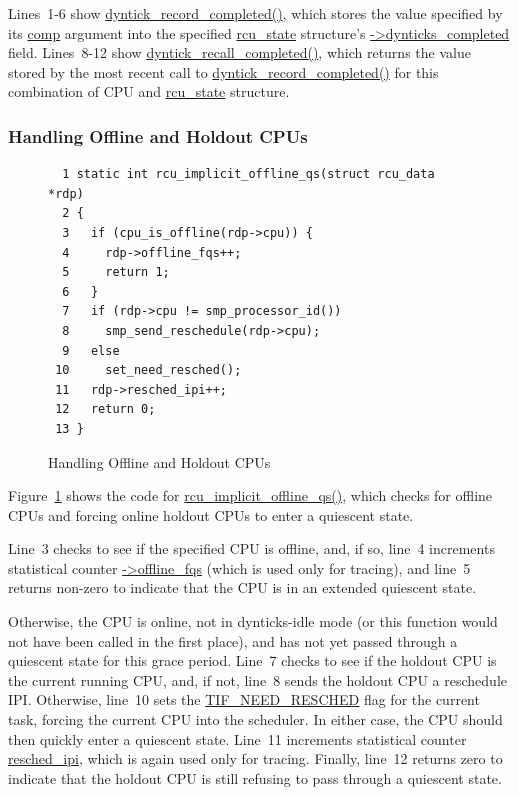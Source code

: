 Lines~1-6 show \url{dyntick_record_completed()}, which stores the
value specified by its \url{comp} argument into the specified
\url{rcu_state} structure's \url{->dynticks_completed} field.
Lines~8-12 show \url{dyntick_recall_completed()}, which returns
the value stored by the most recent call to
\url{dyntick_record_completed()} for this combination of CPU and
\url{rcu_state} structure.

\subsubsection{Handling Offline and Holdout CPUs}
\label{app:rcuimpl:rcutreewt:Handling Offline and Holdout CPUs}

\begin{figure}[tbp]
{ \scriptsize
\begin{verbatim}
  1 static int rcu_implicit_offline_qs(struct rcu_data *rdp)
  2 {
  3   if (cpu_is_offline(rdp->cpu)) {
  4     rdp->offline_fqs++;
  5     return 1;
  6   }
  7   if (rdp->cpu != smp_processor_id())
  8     smp_send_reschedule(rdp->cpu);
  9   else
 10     set_need_resched();
 11   rdp->resched_ipi++;
 12   return 0;
 13 }
\end{verbatim}
}
\caption{Handling Offline and Holdout CPUs}
\label{fig:app:rcuimpl:rcutreewt:Handling Offline and Holdout CPUs}
\end{figure}

Figure~\ref{fig:app:rcuimpl:rcutreewt:Handling Offline and Holdout CPUs}
shows the code for \url{rcu_implicit_offline_qs()}, which checks for
offline CPUs and forcing online holdout CPUs to enter a quiescent state.

Line~3 checks to see if the specified CPU is offline, and, if so,
line~4 increments statistical counter \url{->offline_fqs} (which is
used only for tracing), and line~5 returns non-zero to indicate
that the CPU is in an extended quiescent state.

Otherwise, the CPU is online, not in dynticks-idle mode (or this
function would not have been called in the first place), and has
not yet passed through a quiescent state for this grace period.
Line~7 checks to see if the holdout CPU is the current running
CPU, and, if not, line~8 sends the holdout CPU a reschedule IPI.
Otherwise, line~10 sets the \url{TIF_NEED_RESCHED} flag for the
current task, forcing the current CPU into the scheduler.
In either case, the CPU should then quickly enter a quiescent
state.
Line~11 increments statistical counter \url{resched_ipi}, which is
again used only for tracing.
Finally, line~12 returns zero to indicate that the holdout CPU is
still refusing to pass through a quiescent state.

